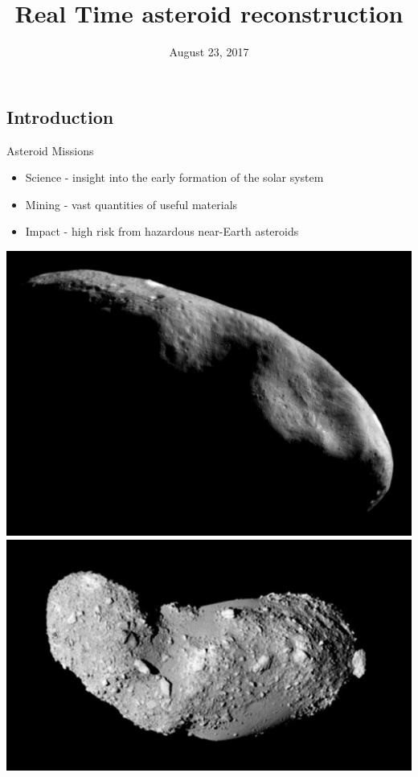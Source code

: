 \documentclass[11pt,professionalfonts]{beamer}
\title[Asteroid Reconstruction]{\large\textbf Real Time asteroid reconstruction}
\author{\vspace*{-0.3cm}}
\institute{
	\footnotesize
	{\normalsize\bf{Shankar Kulumani\\ Advisor: Taeyoung Lee}}\\
	\vspace*{0.2cm}
  	\textbf{Department of Mechanical \& Aerospace Engineering}\\ \vspace*{0.5cm}
 	\begin{figure} %
       	\texttt{[image: gw\_txh\_2cs\_pos]}
  	\end{figure}
}
\date{August 23, 2017}
\begin{document}

\setcounter{framenumber}{-1}
\begin{frame} %
  \titlepage
\end{frame}   %

\section*{}
\subsection*{Introduction}  
\begin{frame}{Asteroid Missions}
\begin{itemize}
    \item Science - insight into the early formation of the solar system
    \item Mining - vast quantities of useful materials
    \item Impact - high risk from hazardous near-Earth asteroids
\end{itemize}    

\begin{center}
    \includegraphics[height=0.35\textheight]{figures/near_mos_20001203_full.jpg}
    \hfill
    \includegraphics[height=0.35\textheight]{figures/Itokawa8_hayabusa_1210.jpg}
\end{center}
\end{frame}
\end{document}
